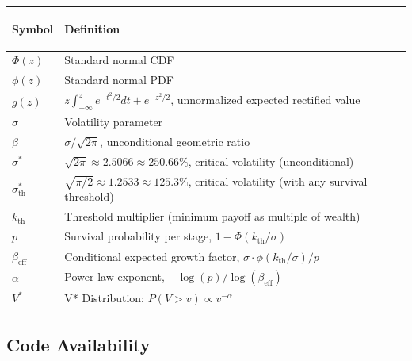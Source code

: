 \documentclass[
  11pt,
  openany]{article}
\newcounter{none} %
\begin{document}
{\def\LTcaptype{none} %
\begin{longtable}[]{@{}
  >{\raggedright\arraybackslash}p{}
  >{\raggedright\arraybackslash}p{}@{}}
\toprule\noalign{}
\begin{minipage}[b]{\linewidth}\raggedright
{\bfseries 

Symbol

}
\end{minipage} & \begin{minipage}[b]{\linewidth}\raggedright
{\bfseries 

Definition

}
\end{minipage} \\
\midrule\noalign{}
\endhead
\bottomrule\noalign{}
\endlastfoot
\(\Phi(z)\) & Standard normal CDF \\
\(\phi(z)\) & Standard normal PDF \\
\(g(z)\) & \(z \int_{-\infty}^{z} e^{-t^2/2} dt + e^{-z^2/2}\),
unnormalized expected rectified value \\
\(\sigma\) & Volatility parameter \\
\(\beta\) & \(\sigma/\sqrt{2\pi}\), unconditional geometric ratio \\
\(\sigma^*\) & \(\sqrt{2\pi} \approx 2.5066 \approx 250.66\%\), critical
volatility (unconditional) \\
\(\sigma_{\text{th}}^{*}\) &
\(\sqrt{\pi/2} \approx 1.2533 \approx 125.3\%\), critical volatility
(with any survival threshold) \\
\(k_{\text{th}}\) & Threshold multiplier (minimum payoff as multiple of
wealth) \\
\(p\) & Survival probability per stage,
\(1 - \Phi(k_{\text{th}}/\sigma)\) \\
\(\beta_{\text{eff}}\) & Conditional expected growth factor,
\(\sigma \cdot \phi(k_{\text{th}}/\sigma) / p\) \\
\(\alpha\) & Power-law exponent,
\(-\log(p)/\log(\beta_{\text{eff}})\) \\
\(V^*\) & V* Distribution: \(P(V > v) \propto v^{-\alpha}\) \\
\end{longtable}
}


\subsection{Code Availability}\label{code-availability}
\end{document}

